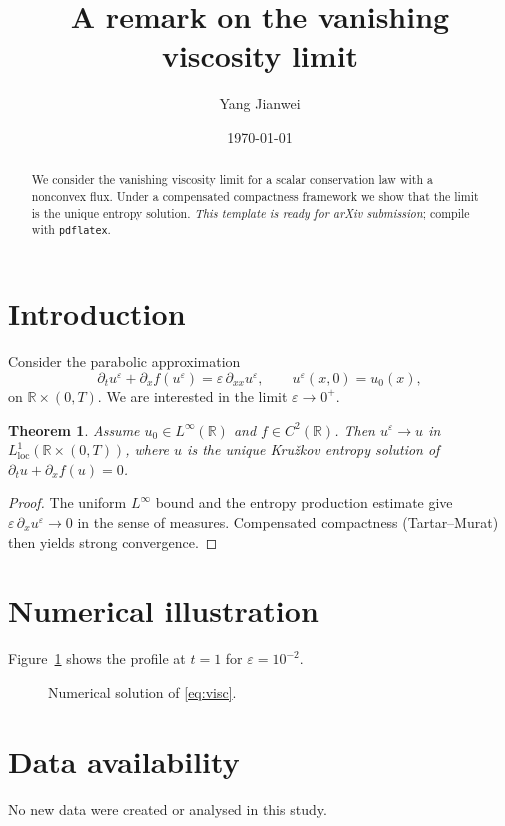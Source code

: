 \documentclass[11pt,a4paper]{article}
\title{A remark on the vanishing viscosity limit}
\author{Yang Jianwei}
\date{\today}
\newtheorem{theorem}{Theorem}[section]
\theoremstyle{definition}
\newcommand{\R}{\mathbb{R}}
\newcommand{\eps}{\varepsilon}
\begin{document}
\maketitle

\begin{abstract}
We consider the vanishing viscosity limit for a scalar conservation law
with a nonconvex flux. Under a compensated compactness framework we show
that the limit is the unique entropy solution. \emph{This template is
ready for arXiv submission}; compile with \texttt{pdflatex}.
\end{abstract}

\section{Introduction}

Consider the parabolic approximation
\begin{equation}\label{eq:visc}
  \partial_t u^\eps + \partial_x f(u^\eps) = \eps\,\partial_{xx}u^\eps,
  \qquad u^\eps(x,0)=u_0(x),
\end{equation}
on $\R\times(0,T)$. We are interested in the limit $\eps\to0^+$.

\begin{theorem}
Assume $u_0\in L^\infty(\R)$ and $f\in C^2(\R)$. Then
$u^\eps\to u$ in $L^1_{\mathrm{loc}}(\R\times(0,T))$, where $u$ is the
unique Kru{\v z}kov entropy solution of
$\partial_t u+\partial_x f(u)=0$.
\end{theorem}

\begin{proof}
The uniform $L^\infty$ bound and the entropy production estimate give
$\eps\,\partial_x u^\eps\to0$ in the sense of measures. Compensated
compactness (Tartar--Murat) then yields strong convergence.
\end{proof}

\section{Numerical illustration}

Figure~\ref{fig:one} shows the profile at $t=1$ for $\eps=10^{-2}$.

\begin{figure}[htbp]
\centering
\caption{Numerical solution of \eqref{eq:visc}.}\label{fig:one}
\end{figure}

\section*{Data availability}
No new data were created or analysed in this study.
\end{document}
